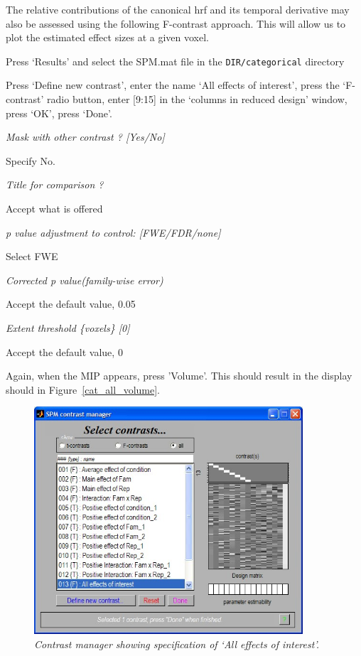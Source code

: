 The relative contributions of the canonical hrf and its temporal derivative may also be assessed using the following F-contrast approach. This will allow us to plot the estimated effect sizes at a given voxel.
\bi
\item{Press `Results' and select the SPM.mat file in the 
\verb!DIR/categorical! directory}
\item{Press `Define new contrast', enter the name `All effects of interest', press the `F-contrast' radio button, enter [9:15] in the `columns in reduced design' window, press `OK', press `Done'.}
\item{\em Mask with other contrast ? [Yes/No]}
\item{Specify No.}
\item{\em Title for comparison ?}
\item{Accept what is offered}
\item{\em p value adjustment to control: [FWE/FDR/none]}
\item{Select FWE}
\item{\em Corrected p value(family-wise error)}
\item{Accept the default value, 0.05}
\item{\em Extent threshold \{voxels\} [0]}
\item{Accept the default value, 0}
\ei

Again, when the MIP appears, press 'Volume'. This should result in the display should in Figure~\ref{cat_all_volume}.

\begin{figure}
\begin{center}
\includegraphics[width=100mm]{faces/cat_all_contrast}
\caption{\em Contrast manager showing specification of `All effects of interest'. \label{cat_all_contrast} }
\end{center}
\end{figure}

